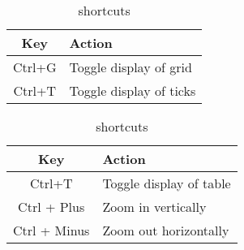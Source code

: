 \begin{table}[ht]
  \centering
  \begin{tabular}{cl}
    \textbf{Key}	& \textbf{Action} \\ \toprule
    Ctrl+G		& Toggle display of grid \\
    Ctrl+T		& Toggle display of ticks \\ \bottomrule
  \end{tabular}
  \caption{\Pview shortcuts}
\end{table}

\begin{table}[ht]
  \centering
  \begin{tabular}{cl}
    \textbf{Key}	& \textbf{Action} \\ \toprule
    Ctrl+T		& Toggle display of table \\
    Ctrl + Plus		& Zoom in vertically \\
    Ctrl + Minus	& Zoom out horizontally\\ \bottomrule
  \end{tabular}
  \caption{\Dview shortcuts}
\end{table}